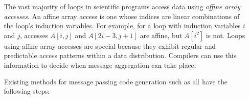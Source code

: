 The vast majority of loops in scientific programs access data using \textit{affine array accesses}. An affine array access is one whose indices are linear combinations of the loop's induction variables. For example, for a loop with induction variables $i$ and $j$, accesses $A[i, j]$ and $A[2i-3, j+1]$ are affine, but $A[i^2]$ is not. Loops using affine array accesses are special because they exhibit regular and predictable access patterns within a data distribution. Compilers can use this information to decide when message aggregation can take place. 

\begin{comment}
Although a simple concept to understand, message aggregation is the most complicated part of message passing code generation. Existing methods \cite{goumas2006message, xue1997communication} split the loop iteration space into tiles (also known as footprints) of consecutive iterations, and each locale executes its tile's iterations in parallel. Communication using aggregation takes place between locales just before and after the computation within a single tile. These methods require the compiler to do complex footprint calculations, optimizing for tile size and shape, before message aggregation can take place. As \cite{ramanujam1992tiling} shows, determining tile shape quickly becomes difficult for more complicated loop structures, since the optimum tile shape for a computation is not always rectangular. It is our belief that message aggregation using tiling is not used in production quality compilers today because of the complexity of message aggregation calculations, described above. What is needed is a simple, robust, and widely applicable method for message aggregation that leads to improvements in performance. 
\end{comment}

Existing methods for message passing code generation such as \cite{Gupta91automaticdata, xue1997communication} all have the following steps:

